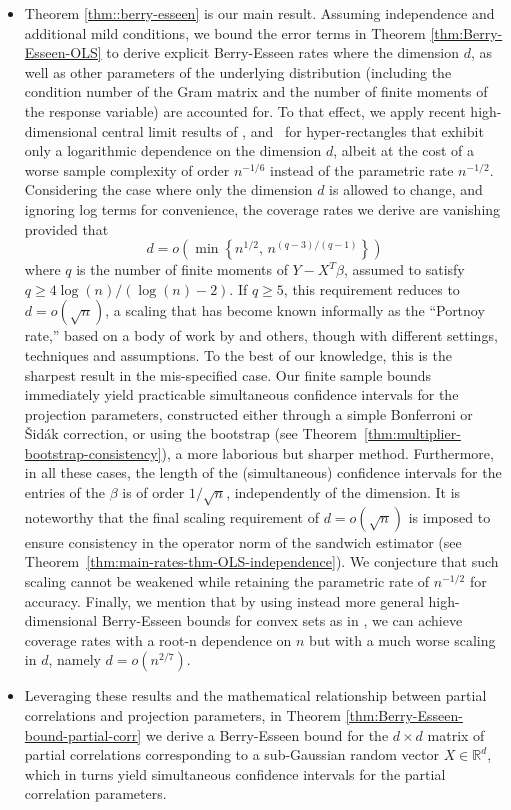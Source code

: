 \documentclass[11pt]{article}
\begin{document}
\begin{itemize}
\item
Theorem \ref{thm::berry-esseen} 
is our main result.
Assuming independence and additional mild conditions,
we bound the error terms in
Theorem \ref{thm:Berry-Esseen-OLS} 
to derive explicit Berry-Esseen rates where the dimension $d$, as well as other parameters of the underlying distribution (including the condition number of the Gram matrix and the number of finite moments of the response variable) are accounted for.
To that effect, we apply recent high-dimensional central limit results of \cite{koike2019high}, and~\cite{Chern17} for hyper-rectangles that exhibit only a logarithmic dependence on the dimension $d$, albeit at the cost of a worse sample complexity of order  $n^{-1/6}$ instead of the parametric rate $n^{-1/2}$.
Considering  the case where only the dimension $d$ is allowed to change, and ignoring log terms for convenience, the coverage rates we derive are vanishing provided that
$$
d = o\left(\min\left\{n^{1/2},\, n^{(q-3)/(q-1)}\right\}\right)
$$
where $q$ is the number of
finite moments of
$Y-X^T\beta$, assumed to satisfy $q \geq 4 \log(n)/(\log(n) - 2)$. 
If $q \ge 5$, this requirement reduces to $d = o(\sqrt{n})$, a scaling that has become  known informally as the ``Portnoy rate,'' based on a body of work by  \cite{Portnoy84,Portnoy85,Portnoy86,Portnoy88} and others, though with different settings, techniques  and assumptions. 
To the best of our knowledge,
this is the sharpest result
in the mis-specified case. Our finite sample bounds immediately yield practicable simultaneous confidence intervals for the projection parameters, constructed either through a simple Bonferroni or {\v{S}}id{\'a}k correction, or using the bootstrap (see Theorem~\ref{thm:multiplier-bootstrap-consistency}), a more laborious but sharper method. Furthermore, in all these cases, the length of the (simultaneous) confidence intervals for the entries of the $\beta$ is of order $1/\sqrt{n}$, independently of the dimension.
It is noteworthy that the final scaling requirement of $d = o(\sqrt{n})$ is imposed to ensure consistency in the operator norm of the sandwich estimator (see Theorem~\ref{thm:main-rates-thm-OLS-independence}). We conjecture that such scaling cannot be weakened while retaining the parametric rate of $n^{-1/2}$ for accuracy.  
 Finally, we mention that by using instead more general high-dimensional Berry-Esseen bounds for convex sets as in \cite{bentkus2003dependence,raivc2019multivariate}, we can achieve coverage rates with a root-n dependence on $n$ but with a much worse scaling in $d$, namely $d = o(n^{2/7})$.

\item 
Leveraging these results and the mathematical relationship between partial correlations and projection parameters, in Theorem \ref{thm:Berry-Esseen-bound-partial-corr}
we derive a Berry-Esseen bound
for the $d\times d$ matrix of partial correlations
corresponding to a sub-Gaussian random vector $X\in\mathbb{R}^d$, which in turns yield simultaneous confidence intervals for the partial correlation parameters.  


\end{itemize}
\end{document}

